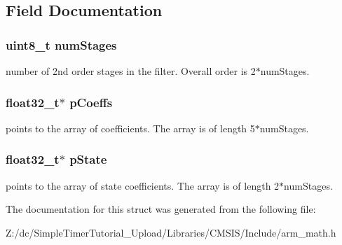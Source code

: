 \subsection{Field Documentation}
\hypertarget{structarm__biquad__cascade__df2_t__instance__f32_a3615af038f56917909e0370c11bc2ec7}{
\subsubsection[{num\-Stages}]{\setlength{\rightskip}{0pt plus 5cm}uint8\-\_\-t num\-Stages}}\label{structarm__biquad__cascade__df2_t__instance__f32_a3615af038f56917909e0370c11bc2ec7}
number of 2nd order stages in the filter. Overall order is 2$\ast$num\-Stages. \hypertarget{structarm__biquad__cascade__df2_t__instance__f32_aacbb8dd8eeba4b21fc2bb40076405ee3}{
\subsubsection[{p\-Coeffs}]{\setlength{\rightskip}{0pt plus 5cm}float32\-\_\-t$\ast$ p\-Coeffs}}\label{structarm__biquad__cascade__df2_t__instance__f32_aacbb8dd8eeba4b21fc2bb40076405ee3}
points to the array of coefficients. The array is of length 5$\ast$num\-Stages. \hypertarget{structarm__biquad__cascade__df2_t__instance__f32_a335c87e6fdc4b96601d95a5de8b9c463}{
\subsubsection[{p\-State}]{\setlength{\rightskip}{0pt plus 5cm}float32\-\_\-t$\ast$ p\-State}}\label{structarm__biquad__cascade__df2_t__instance__f32_a335c87e6fdc4b96601d95a5de8b9c463}
points to the array of state coefficients. The array is of length 2$\ast$num\-Stages. 

The documentation for this struct was generated from the following file\-:\begin{DoxyCompactItemize}
\item 
Z\-:/dc/\-Simple\-Timer\-Tutorial\-\_\-\-Upload/\-Libraries/\-C\-M\-S\-I\-S/\-Include/arm\-\_\-math.\-h\end{DoxyCompactItemize}
